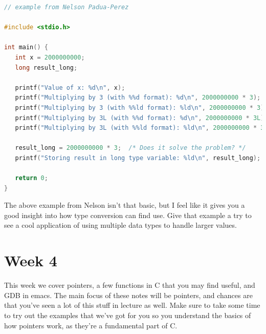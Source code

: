 \documentclass[english, 10pt]{article}
\begin{document}
	{\centering
\begin{lstlisting}[language=C]
// example from Nelson Padua-Perez

#include <stdio.h>                                                                    
                                                                                      
int main() {                                                                          
   int x = 2000000000;                                                                
   long result_long;                                                                  
                                                                                      
   printf("Value of x: %d\n", x);                                                     
   printf("Multiplying by 3 (with %%d format): %d\n", 2000000000 * 3);                
   printf("Multiplying by 3 (with %%ld format): %ld\n", 2000000000 * 3);              
   printf("Multiplying by 3L (with %%d format): %d\n", 2000000000 * 3L);              
   printf("Multiplying by 3L (with %%ld format): %ld\n", 2000000000 * 3L);            
                                                                                      
   result_long = 2000000000 * 3;  /* Does it solve the problem? */                    
   printf("Storing result in long type variable: %ld\n", result_long);                
                                                                                      
   return 0;                                                                          
}
\end{lstlisting}
}

The above example from Nelson isn't that basic, but I feel like it gives you a good insight into how type conversion can find use. Give that example a try to see a cool application of using multiple data types to handle larger values.

\section{Week 4}

This week we cover pointers, a few functions in C that you may find useful, and GDB in emacs. The main focus of these notes will be pointers, and chances are that you've seen a lot of this stuff in lecture as well. Make sure to take some time to try out the examples that we've got for you so you understand the basics of how pointers work, as they're a fundamental part of C.
\end{document}
